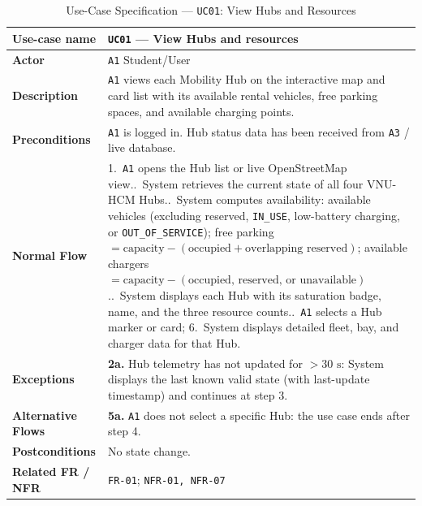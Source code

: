 \begin{table}[H]
  \centering
  \singlespacing\footnotesize
  \caption{Use-Case Specification --- \texttt{UC01}: View Hubs and Resources}
  \label{tab:uc01}
  \renewcommand{\arraystretch}{1.13}
  \begin{tabularx}{\textwidth}{|L{2.9cm}|Y|}
    \hline
    \textbf{Use-case name} & \textbf{\texttt{UC01} --- View Hubs and resources} \\
    \hline
    \textbf{Actor} & \texttt{A1} Student/User \\
    \hline
    \textbf{Description} & \texttt{A1} views each Mobility Hub on the interactive map and card list with its available rental vehicles, free parking spaces, and available charging points. \\
    \hline
    \textbf{Preconditions} & \texttt{A1} is logged in. Hub status data has been received from \texttt{A3} / live database. \\
    \hline
    \textbf{Normal Flow} & 1.\ \texttt{A1} opens the Hub list or live OpenStreetMap view..\ System retrieves the current state of all four VNU-HCM Hubs..\ System computes availability: available vehicles (excluding reserved, \texttt{IN\_\allowbreak USE}, low-battery charging, or \texttt{OUT\_\allowbreak OF\_\allowbreak SERVICE}); free parking $= \text{capacity} - (\text{occupied} + \text{overlapping reserved})$; available chargers $= \text{capacity} - (\text{occupied, reserved, or unavailable})$..\ System displays each Hub with its saturation badge, name, and the three resource counts..\ \texttt{A1} selects a Hub marker or card; 6.\ System displays detailed fleet, bay, and charger data for that Hub. \\
    \hline
    \textbf{Exceptions} & \textbf{2a.} Hub telemetry has not updated for $>30\text{ s}$: System displays the last known valid state (with last-update timestamp) and continues at step 3. \\
    \hline
    \textbf{Alternative Flows} & \textbf{5a.} \texttt{A1} does not select a specific Hub: the use case ends after step 4. \\
    \hline
    \textbf{Postconditions} & No state change. \\
    \hline
    \textbf{Related FR / NFR} & \texttt{FR-01}; \texttt{NFR-01, NFR-07} \\
    \hline
  \end{tabularx}
\end{table}

